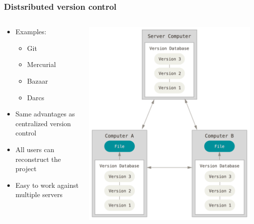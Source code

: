 \begin{frame}
		\frametitle{Distsributed version control}
	\begin{columns}
		\begin{column}{0.5\textwidth}
			\begin{itemize}[<+->]
				\item Examples:
					\begin{itemize}[<+->]
						\item Git
						\item Mercurial
						\item Bazaar
						\item Darcs
					\end{itemize}
				\item Same advantages as centralized version control
				\item All users can reconstruct the project
				\item Easy to work against multiple servers
			\end{itemize}
		\end{column}
		\begin{column}{0.5\textwidth}
			\includegraphics[width=\textwidth]{./pictures/distributed.png}
		\end{column}
	\end{columns}
\end{frame}

